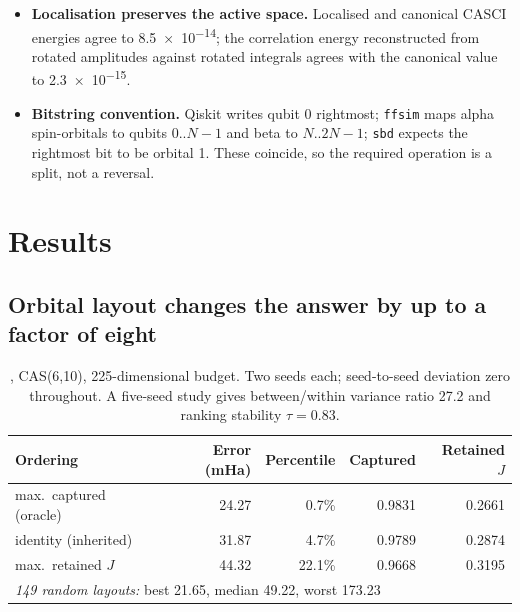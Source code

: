 \documentclass[11pt,a4paper]{article}
\begin{document}
\begin{itemize}
        additionally establishes that \texttt{ffsim}'s
        \texttt{interaction\_pairs} performs post-hoc zeroing of the
        factorised $J$ rather than a constrained fit to $t_2$. The analysis
        presupposes this, and it is now measured rather than assumed.
  \item \textbf{Localisation preserves the active space.} Localised and
        canonical CASCI energies agree to \num{8.5e-14}; the correlation
        energy reconstructed from rotated amplitudes against rotated
        integrals agrees with the canonical value to \num{2.3e-15}.
  \item \textbf{Bitstring convention.} Qiskit writes qubit 0 rightmost;
        \texttt{ffsim} maps alpha spin-orbitals to qubits $0..N-1$ and beta
        to $N..2N-1$; \texttt{sbd} expects the rightmost bit to be orbital 1.
        These coincide, so the required operation is a split, not a reversal.
\end{itemize}

\FloatBarrier
\section{Results}

\subsection{Orbital layout changes the answer by up to a factor of eight}

\begin{table}[htbp]\centering\small
\begin{tabular}{lrrrr}
\toprule
Ordering & Error (mHa) & Percentile & Captured & Retained $J$\\
\midrule
max.\ captured (oracle) & 24.27 & 0.7\% & 0.9831 & 0.2661\\
identity (inherited)    & 31.87 & 4.7\% & 0.9789 & 0.2874\\
max.\ retained $J$      & 44.32 & 22.1\%& 0.9668 & 0.3195\\
\midrule
\multicolumn{5}{l}{\emph{149 random layouts:} best 21.65, median 49.22, worst 173.23}\\
\bottomrule
\end{tabular}
\caption{, CAS(6,10), 225-dimensional budget. Two seeds each;
seed-to-seed deviation zero throughout. A five-seed study gives between/within
variance ratio 27.2 and ranking stability $\tau=0.83$.}
\end{table}
\end{document}
